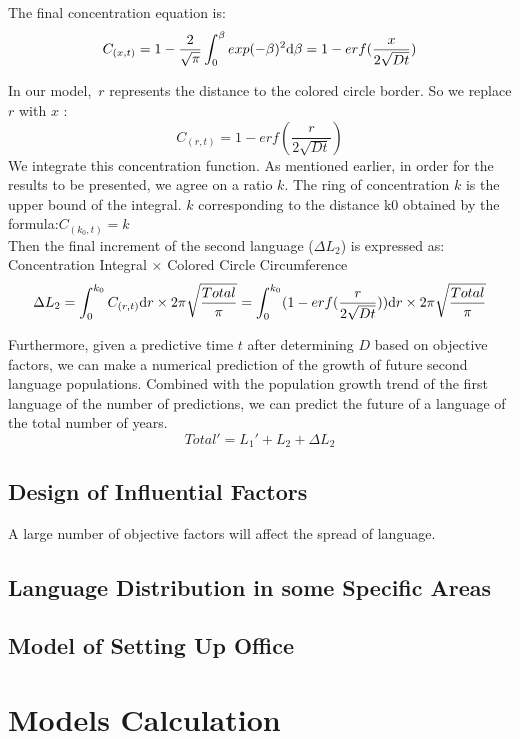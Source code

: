 \documentclass{mcmthesis}
\begin{document}
    The final concentration equation is:
    $$C_{(x,t)}=1-\frac{2}{\sqrt{\pi}}\int_0^\beta exp(-\beta)^2{\rm d}\beta=1-erf(\frac{x}{2\sqrt{Dt}})$$

    In our model,\ $r$ represents the distance to the colored circle border.
    So we replace $r$ with $x$ :
    $$C_{(r,t)}=1-erf(\frac{r}{2\sqrt{Dt}})$$
    We integrate this concentration function.
    As mentioned earlier, in order for the results to be presented, we agree on a ratio $k$.
    The ring of concentration $k$ is the upper bound of the integral.
    $k$ corresponding to the distance k0 obtained by the formula:$C_{(k_0,t)}=k$
    \\Then the final increment of the second language ($\Delta L_2$) is expressed as:
    Concentration Integral × Colored Circle Circumference
    $$\Delta L_2=\int_0^{k_0} C_{(r,t)}{\rm d}r\times 2\pi\sqrt{\frac{Total}{\pi}}=\int_0^{k_0}(1-erf(\frac{r}{2\sqrt{Dt}})){\rm d}r\times 2\pi\sqrt{\frac{Total}{\pi}}$$

    Furthermore, given a predictive time $t$ after determining $D$ based on objective factors,
    we can make a numerical prediction of the growth of future second language populations.
    Combined with the population growth trend of the first language of the number of predictions,
    we can predict the future of a language of the total number of years.
    $$Total'=L_1'+L_2+\Delta L_2$$



    \subsection{Design of Influential Factors}%
    A large number of objective factors will affect the spread of language.

    \subsection{Language Distribution in some Specific Areas}%

    \subsection{Model of Setting Up Office}%

  \section{Models Calculation}%
\end{document}
